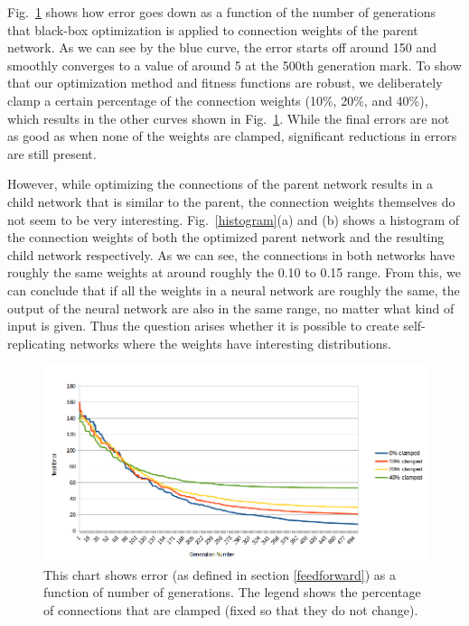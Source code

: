 \documentclass[12pt]{article}
\begin{document}
Fig.~\ref{result1} shows how error goes down
as a function of the number of generations
that black-box optimization is applied
to connection weights of the parent network.
As we can see by the blue curve,
the error starts off around 150 and smoothly converges
to a value of around 5 at the 500th generation mark.
To show that our optimization method
and fitness functions are robust,
we deliberately clamp a certain percentage
of the connection weights (10\%, 20\%, and 40\%),
which results in the other curves
shown in Fig.~\ref{result1}.
While the final errors are not as good
as when none of the weights are clamped,
significant reductions in errors are still present.

However, while optimizing the connections
of the parent network results in a child network
that is similar to the parent,
the connection weights themselves do not seem
to be very interesting.
Fig.~\ref{histogram}(a) and (b) shows a histogram
of the connection weights
of both the optimized parent network
and the resulting child network respectively.
As we can see, the connections in both networks
have roughly the same weights
at around roughly the 0.10 to 0.15 range.
From this, we can conclude that
if all the weights in a neural network are roughly the same,
the output of the neural network are also in the same range,
no matter what kind of input is given.
Thus the question arises whether it is
possible to create self-replicating networks
where the weights have interesting distributions. 

\begin{figure}[h]
\begin{center}
  \includegraphics[width=1.0\linewidth]{result1.png}
\end{center}
   \caption{This chart shows error (as defined in section \ref{feedforward}) as a function of number of generations. The legend shows the percentage of connections that are clamped (fixed so that they do not change).}
\label{result1}
\end{figure}
\end{document}
